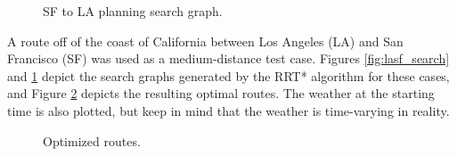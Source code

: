 \documentclass[conference]{IEEEtran}
\begin{document}
\begin{figure}[!ht]
    \centering
    \caption{SF to LA planning search graph.}
    \label{fig:sfla_search}
\end{figure}

A route off of the coast of California between Los Angeles (LA) and San Francisco (SF) was used as a medium-distance test case. Figures \ref{fig:lasf_search} and \ref{fig:sfla_search} depict the search graphs generated by the RRT* algorithm for these cases, and Figure \ref{fig:routes} depicts the resulting optimal routes. The weather at the starting time is also plotted, but keep in mind that the weather is time-varying in reality.

\begin{figure}[!ht]
    \centering
    \hspace{0mm}
    \caption{Optimized routes.}
    \label{fig:routes}
\end{figure}
\end{document}
